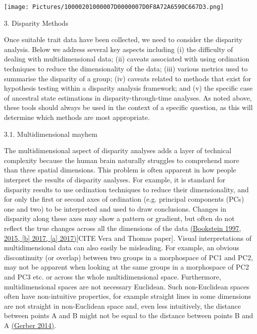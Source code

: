 \texttt{[image: Pictures/10000201000007D0000007D0F8A72A6590C667D3.png]}

3. Disparity Methods

Once suitable trait data have been collected, we need to consider the
disparity analysis. Below we address several key aspects including (i)
the difficulty of dealing with multidimensional data; (ii) caveats
associated with using ordination techniques to reduce the dimensionality
of the data; (iii) various metrics used to summarise the disparity of a
group; (iv) caveats related to methods that exist for hypothesis testing
within a disparity analysis framework; and (v) the specific case of
ancestral state estimations in disparity-through-time analyses. As noted
above, these tools should always be used in the context of a specific
question, as this will determine which methods are most appropriate.

\protect\hypertarget{anchor}{}{}3.1. Multidimensional mayhem

The multidimensional aspect of disparity analyses adds a layer of
technical complexity because the human brain naturally struggles to
comprehend more than three spatial dimensions. This problem is often
apparent in how people interpret the results of disparity analyses. For
example, it is standard for disparity results to use ordination
techniques to reduce their dimensionality, and for only the first or
second axes of ordination (e.g. principal components (PCs) one and two)
to be interpreted and used to draw conclusions. Changes in disparity
along these axes may show a pattern or gradient, but often do not
reflect the true changes across all the dimensions of the data
\href{https://paperpile.com/c/sTGYvp/1SD2+sN5d+xaUx+o4w7}{(Bookstein
1997, 2015, {[}b{]} 2017, {[}a{]}
20}\href{https://paperpile.com/c/sTGYvp/1SD2+sN5d+xaUx+o4w7}{1}\href{https://paperpile.com/c/sTGYvp/1SD2+sN5d+xaUx+o4w7}{7)}{[}CITE
Vera and Thomas paper{]}. Visual interpretations of multidimensional
data can also easily be misleading. For example, an obvious
discontinuity (or overlap) between two groups in a morphospace of PC1
and PC2, may not be apparent when looking at the same groups in a
morphospace of PC2 and PC3 etc. or across the whole multidimensional
space. Furthermore, multidimensional spaces are not necessary Euclidean.
Such non-Euclidean spaces often have non-intuitive properties, for
example straight lines in some dimensions are not straight in
non-Euclidean space and, even less intuitively, the distance between
points A and B might not be equal to the distance between points B and A
\href{https://paperpile.com/c/sTGYvp/SJbC}{(Gerber 2014)}.

